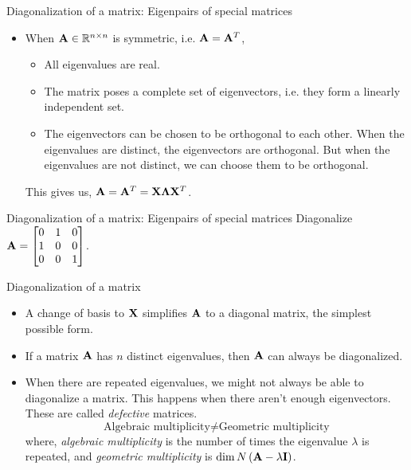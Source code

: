 \documentclass[aspectratio=169]{beamer}
\let\olditem\item
\renewcommand{\item}{\setlength{\itemsep}{\fill}\olditem}
\def\mf{\ensuremath\mathbf}
\def\mb{\ensuremath\mathbb}
\def\lp{\ensuremath\left(}
\def\rp{\ensuremath\right)}
\def\bmx{\ensuremath\begin{bmatrix*}[r]}
\def\emx{\ensuremath\end{bmatrix*}}
\begin{document}
\begin{frame}[t]{Diagonalization of a matrix: Eigenpairs of special matrices}
\begin{itemize}
    \item When $\mf{A} \in \mb{R}^{n \times n}$ is symmetric, i.e. $\mf{A} = \mf{A}^T$,
    \begin{itemize}
        \item All eigenvalues are real.
        \item The matrix poses a complete set of eigenvectors, i.e. they form a linearly independent set.
        \item The eigenvectors can be chosen to be orthogonal to each other. When the eigenvalues are distinct, the eigenvectors are orthogonal. But when the eigenvalues are not distinct, we can choose them to be orthogonal.
    \end{itemize}
    This gives us, $\mf{A} = \mf{A}^T = \mf{X}\mf{\Lambda}\mf{X}^T$.
\end{itemize}
\end{frame}


\begin{frame}[t]{Diagonalization of a matrix: Eigenpairs of special matrices}
    Diagonalize $\mf{A} = \bmx 0 & 1 & 0\\1 & 0 & 0\\0 & 0 & 1\emx$.
\end{frame}


\begin{frame}[t]{Diagonalization of a matrix}
\begin{itemize}
    \item A change of basis to $\mf{X}$ simplifies $\mf{A}$ to a diagonal matrix, the simplest possible form.

    \item If a matrix $\mf{A}$ has $n$ distinct eigenvalues, then $\mf{A}$ can always be diagonalized.

    \item When there are repeated eigenvalues, we might not always be able to diagonalize a matrix. This happens when there aren't enough eigenvectors. These are called \textit{defective} matrices.
    \[ \text{Algebraic multiplicity} \neq \text{Geometric multiplicity} \]
    where, \textit{algebraic multiplicity} is the number of times the eigenvalue $\lambda$ is repeated, and \textit{geometric multiplicity} is $\dim N\lp \mf{A} - \lambda\mf{I}\rp$.
\end{itemize}
\end{frame}
\end{document}
